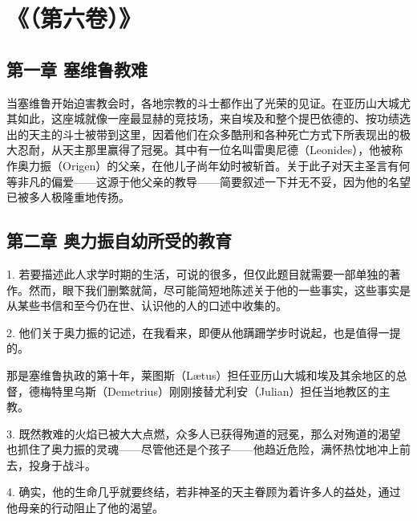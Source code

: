 
\section{《（第六卷）》}


\subsection{第一章 塞维鲁教难}

当塞维鲁开始迫害教会时，各地宗教的斗士都作出了光荣的见证。在亚历山大城尤其如此，这座城就像一座最显赫的竞技场，来自埃及和整个提巴依德的、按功绩选出的天主的斗士被带到这里，因着他们在众多酷刑和各种死亡方式下所表现出的极大忍耐，从天主那里赢得了冠冕。其中有一位名叫雷奧尼德（Leonides），他被称作奥力振（Origen）的父亲，在他儿子尚年幼时被斩首。关于此子对天主圣言有何等非凡的偏爱——这源于他父亲的教导——简要叙述一下并无不妥，因为他的名望已被多人极隆重地传扬。\par


\subsection{第二章 奥力振自幼所受的教育}

1. 若要描述此人求学时期的生活，可说的很多，但仅此题目就需要一部单独的著作。然而，眼下我们删繁就简，尽可能简短地陈述关于他的一些事实，这些事实是从某些书信和至今仍在世、认识他的人的口述中收集的。\par

2. 他们关于奥力振的记述，在我看来，即便从他蹒跚学步时说起，也是值得一提的。\par

那是塞维鲁执政的第十年，莱图斯（Lætus）担任亚历山大城和埃及其余地区的总督，德梅特里乌斯（Demetrius）刚刚接替尤利安（Julian）担任当地教区的主教。\par

3. 既然教难的火焰已被大大点燃，众多人已获得殉道的冠冕，那么对殉道的渴望也抓住了奥力振的灵魂——尽管他还是个孩子——他趋近危险，满怀热忱地冲上前去，投身于战斗。\par

4. 确实，他的生命几乎就要终结，若非神圣的天主眷顾为着许多人的益处，通过他母亲的行动阻止了他的渴望。\par

